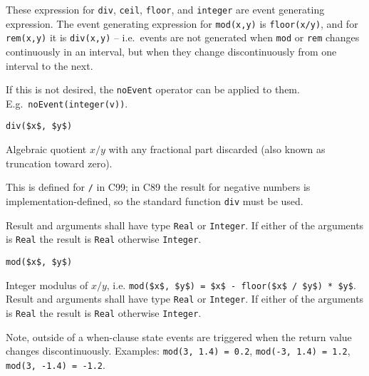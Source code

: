 These expression for \lstinline!div!, \lstinline!ceil!, \lstinline!floor!, and \lstinline!integer! are event generating expression.  The event generating expression for \lstinline!mod(x,y)! is \lstinline!floor(x/y)!, and for \lstinline!rem(x,y)! it is \lstinline!div(x,y)! -- i.e.\ events are not generated when \lstinline!mod! or \lstinline!rem! changes continuously in an interval, but when they change discontinuously from one interval to the next.

\begin{nonnormative}
If this is not desired, the \lstinline!noEvent! operator can be applied to them.  E.g.\ \lstinline!noEvent(integer(v))!.
\end{nonnormative}

\begin{operatordefinition}[div]
\begin{synopsis}\begin{lstlisting}
div($x$, $y$)
\end{lstlisting}\end{synopsis}
\begin{semantics}
Algebraic quotient $x / y$ with any fractional part discarded (also known as truncation toward zero).
\begin{nonnormative}
This is defined for \lstinline!/! in C99; in C89 the result for negative numbers is implementation-defined, so the standard function \lstinline[language=C]!div! must be used.
\end{nonnormative}
Result and arguments shall have type \lstinline!Real! or \lstinline!Integer!.  If either of the arguments is \lstinline!Real! the result is \lstinline!Real! otherwise \lstinline!Integer!.
\end{semantics}
\end{operatordefinition}

\begin{operatordefinition}[mod]
\begin{synopsis}\begin{lstlisting}
mod($x$, $y$)
\end{lstlisting}\end{synopsis}
\begin{semantics}
Integer modulus of $x / y$, i.e. \lstinline!mod($x$, $y$) = $x$ - floor($x$ / $y$) * $y$!.  Result and arguments shall have type \lstinline!Real! or \lstinline!Integer!.  If either of the arguments is \lstinline!Real! the result is \lstinline!Real! otherwise \lstinline!Integer!.
\begin{nonnormative}
Note, outside of a when-clause state events are triggered when the return value changes discontinuously.  Examples: \lstinline!mod(3, 1.4) = 0.2!, \lstinline!mod(-3, 1.4) = 1.2!, \lstinline!mod(3, -1.4) = -1.2!.
\end{nonnormative}
\end{semantics}
\end{operatordefinition}


